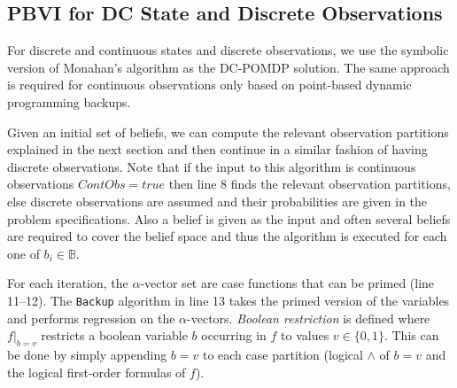 \documentclass{article} %
\newcommand{\open}{\mathit{open}}
\newcommand{\close}{\mathit{close}}
\begin{document}
\subsection{PBVI for DC State and Discrete Observations} 

For discrete and continuous states and discrete observations, we use the symbolic version of Monahan's algorithm as the DC-POMDP solution. The same approach is required for continuous observations only based on point-based dynamic programming backups.

Given an initial set of beliefs, we can compute the relevant observation partitions explained in the next section and then continue in a similar fashion of having discrete observations. %
Note that if the input to this algorithm is continuous observations $ContObs=true$ then line 8 finds the relevant observation partitions, else discrete observations are assumed and their probabilities are given in the problem specifications. Also a belief is given as the input and often several beliefs are required to cover the belief space and thus the algorithm is executed for each one of $b_i \in \mathbb{B}$.

For each iteration, the $\alpha$-vector set are case functions that can be primed (line 11--12). 
The \texttt{Backup} algorithm in line 13 takes the primed version of the variables and performs regression on the $\alpha$-vectors. 
\emph{Boolean restriction} is defined where $f|_{b=v}$ restricts a boolean variable $b$ occurring in $f$ to values $v \in \{ 0,1 \}$. This can be done by simply appending $b=v$ to each case partition (logical $\wedge$ of $b=v$ and the logical first-order formulas of $f$). 
\end{document}
